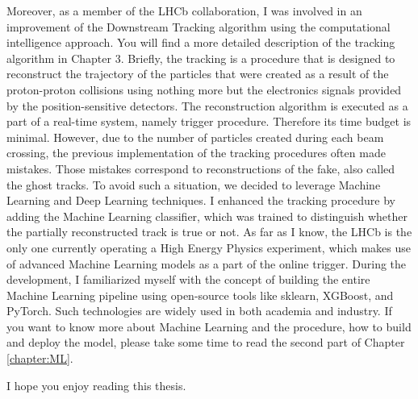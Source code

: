 Moreover, as a member of the LHCb collaboration, I was involved in an improvement of the Downstream Tracking algorithm using the computational intelligence approach. You will find a more detailed description of the tracking algorithm in Chapter 3. Briefly, the tracking is a procedure that is designed to reconstruct the trajectory of the particles that were created as a result of the proton-proton collisions using nothing more but the electronics signals provided by the position-sensitive detectors. The reconstruction algorithm is executed as a part of a real-time system, namely trigger procedure. Therefore its time budget is minimal. However, due to the number of particles created during each beam crossing, the previous implementation of the tracking procedures often made mistakes. Those mistakes correspond to reconstructions of the fake, also called the ghost tracks. To avoid such a situation, we decided to leverage Machine Learning and Deep Learning techniques. I enhanced the tracking procedure by adding the Machine Learning classifier, which was trained to distinguish whether the partially reconstructed track is true or not. As far as I know, the LHCb is the only one currently operating a High Energy Physics experiment, which makes use of advanced Machine Learning models as a part of the online trigger. During the development, I familiarized myself with the concept of building the entire Machine Learning pipeline using open-source tools like sklearn, XGBoost, and PyTorch. Such technologies are widely used in both academia and industry. If you want to know more about Machine Learning and the procedure, how to build and deploy the model, please take some time to read the second part of Chapter \ref{chapter:ML}. 


I hope you enjoy reading this thesis. 


